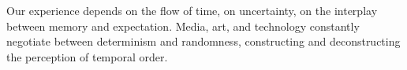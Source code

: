 


Our experience depends on the flow of time, on uncertainty, on the interplay between memory and expectation. Media, art, and technology constantly negotiate between determinism and randomness, constructing and deconstructing the perception of temporal order.






